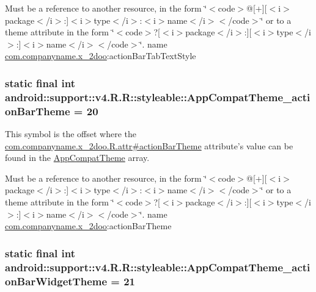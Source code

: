 Must be a reference to another resource, in the form \char`\"{}$<$code$>$@\mbox{[}+\mbox{]}\mbox{[}$<$i$>$package$<$/i$>$:\mbox{]}$<$i$>$type$<$/i$>$:$<$i$>$name$<$/i$>$$<$/code$>$\char`\"{} or to a theme attribute in the form \char`\"{}$<$code$>$?\mbox{[}$<$i$>$package$<$/i$>$:\mbox{]}\mbox{[}$<$i$>$type$<$/i$>$:\mbox{]}$<$i$>$name$<$/i$>$$<$/code$>$\char`\"{}.  name \hyperlink{namespacecom_1_1companyname_1_1x__2doo}{com.companyname.x\_\-2doo}:actionBarTabTextStyle \hypertarget{classandroid_1_1support_1_1v4_1_1_r_1_1styleable_2b2e4f39df58cecdc1b9bf54757c7e22}{
\subsubsection[{AppCompatTheme\_\-actionBarTheme}]{\setlength{\rightskip}{0pt plus 5cm}static final int android::support::v4.R.R::styleable::AppCompatTheme\_\-actionBarTheme = 20}}
\label{classandroid_1_1support_1_1v4_1_1_r_1_1styleable_2b2e4f39df58cecdc1b9bf54757c7e22}


This symbol is the offset where the \hyperlink{classcom_1_1companyname_1_1x__2doo_1_1_r_1_1attr_8fea81c4b86479ee4960ea3d86c7a6e4}{com.companyname.x\_\-2doo.R.attr\#actionBarTheme} attribute's value can be found in the \hyperlink{classandroid_1_1support_1_1v4_1_1_r_1_1styleable_0873e92ba21076bb5a4aeadeb7f5779f}{AppCompatTheme} array.

Must be a reference to another resource, in the form \char`\"{}$<$code$>$@\mbox{[}+\mbox{]}\mbox{[}$<$i$>$package$<$/i$>$:\mbox{]}$<$i$>$type$<$/i$>$:$<$i$>$name$<$/i$>$$<$/code$>$\char`\"{} or to a theme attribute in the form \char`\"{}$<$code$>$?\mbox{[}$<$i$>$package$<$/i$>$:\mbox{]}\mbox{[}$<$i$>$type$<$/i$>$:\mbox{]}$<$i$>$name$<$/i$>$$<$/code$>$\char`\"{}.  name \hyperlink{namespacecom_1_1companyname_1_1x__2doo}{com.companyname.x\_\-2doo}:actionBarTheme \hypertarget{classandroid_1_1support_1_1v4_1_1_r_1_1styleable_1e7154e75762f816225eec7fd9d1ca7b}{
\subsubsection[{AppCompatTheme\_\-actionBarWidgetTheme}]{\setlength{\rightskip}{0pt plus 5cm}static final int android::support::v4.R.R::styleable::AppCompatTheme\_\-actionBarWidgetTheme = 21}}
\label{classandroid_1_1support_1_1v4_1_1_r_1_1styleable_1e7154e75762f816225eec7fd9d1ca7b}


